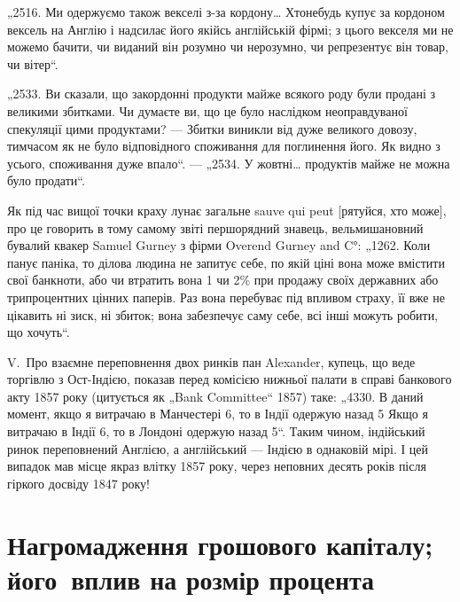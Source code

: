 „2516. Ми одержуємо також векселі з-за кордону\dots{} Хтонебудь купує за кордоном вексель на Англію і
надсилає його якійсь англійській фірмі; з цього векселя ми не можемо бачити, чи виданий він розумно
чи нерозумно, чи репрезентує він товар, чи вітер“.

„2533. Ви сказали, що закордонні продукти майже всякого роду були продані з великими збитками. Чи
думаєте ви, що це було наслідком неоправдуваної
спекуляції цими продуктами? — Збитки виникли від дуже великого довозу, тимчасом як не було
відповідного споживання для поглинення його. Як видно з
усього, споживання дуже впало“. — „2534. У жовтні\dots{} продуктів майже не можна
було продати“.

Як під час вищої точки краху лунає загальне sauve qui peut [рятуйся, хто
може], про це говорить в тому самому звіті першорядний знавець, вельмишановний бувалий квакер Samuel
Gurney з фірми Overend Gurney and C°: „1262. Коли
панує паніка, то ділова людина не запитує себе, по якій ціні вона може вмістити свої банкноти, або
чи втратить вона 1 чи 2\% при продажу своїх державних або трипроцентних цінних паперів. Раз вона
перебуває під впливом страху, її вже не цікавить ні зиск, ні збиток; вона забезпечує саму себе, всі
інші
можуть робити, що хочуть“.

V.~Про взаємне переповнення двох ринків пан Alexander, купець, що веде
торгівлю з Ост-Індією, показав перед комісією нижньої палати в справі банкового акту 1857 року
(цитується як „Bank Committee“ 1857) таке: „4330. В даний
момент, якщо я витрачаю в Манчестері 6, то в Індії одержую назад
5 Якщо я витрачаю в Індії 6, то в Лондоні одержую назад
5“. Таким чином, індійський ринок переповнений Англією, а англійський — Індією в однаковій
мірі. І цей випадок мав місце якраз влітку 1857 року,
через неповних десять років після гіркого досвіду 1847 року!

\section{Нагромадження грошового капіталу; його~вплив на розмір процента}

